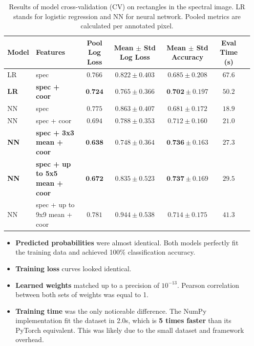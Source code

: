 \documentclass[fleqn,moreauthors,10pt]{ds_report}
\begin{document}
\begin{table}[htb!]
    \centering
    \small
    \begin{tabular}{l l c c c c c}
        \toprule
        \textbf{Model} & \textbf{Features} & \textbf{Pool Log Loss} & \textbf{Mean $\pm$ Std Log Loss} & \textbf{Mean $\pm$ Std Accuracy} & \textbf{Eval Time (s)} \\
        \midrule
        LR & spec & $0.766$ & $0.822 \pm 0.403$ & $0.685 \pm 0.208$ & $67.6$ \\
        \textbf{LR} & \textbf{spec + coor} & $\textbf{0.724}$ & $0.765 \pm 0.366$ & $\textbf{0.702} \pm 0.197$ & $50.2$ \\
        \midrule
        NN & spec & $0.775$ & $0.863 \pm 0.407$ & $0.681 \pm 0.172$ & $18.9$ \\
        NN & spec + coor & $0.694$ & $0.788 \pm 0.353$ & $0.712 \pm 0.160$ & $21.0$ \\
        \textbf{NN} & \textbf{spec + 3x3 mean + coor} & $\textbf{0.638}$ & $0.748 \pm 0.364$ & $\textbf{0.736} \pm 0.163$ & $27.3$ \\
        \textbf{NN} & \textbf{spec + up to 5x5 mean + coor} & $\textbf{0.672}$ & $0.835 \pm 0.523$ & $\textbf{0.737} \pm 0.169$ & $29.5$ \\
        NN & spec + up to 9x9 mean + coor & $0.781$ & $0.944 \pm 0.538$ & $0.714 \pm 0.175$ & $41.3$ \\
        \bottomrule
    \end{tabular}
    \vspace{0.5em}
    \caption{Results of model cross-validation (CV) on rectangles in the spectral image. LR stands for logistic regression and NN for neural network. Pooled metrics are calculated per annotated pixel.}
    \label{tab:model_perf}
\end{table}

\begin{itemize}
\item \textbf{Predicted probabilities} were almost identical. Both models perfectly fit the training data and achieved 100\% classification accuracy.
\item \textbf{Training loss} curves looked identical.
\item \textbf{Learned weights} matched up to a precision of $10^{-13}$. Pearson correlation between both sets of weights was equal to 1.
\item \textbf{Training time} was the only noticeable difference. The NumPy implementation fit the dataset in 2.0s, which is \textbf{5 times faster} than its PyTorch equivalent. This was likely due to the small dataset and framework overhead.
\end{itemize}
\end{document}
